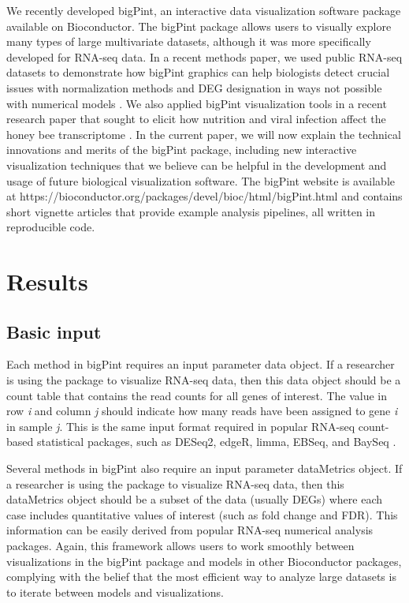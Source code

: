\documentclass[parskip=full]{bmcart}
\begin{document}
We recently developed bigPint, an interactive data visualization software package available on Bioconductor. The bigPint package allows users to visually explore many types of large multivariate datasets, although it was more specifically developed for RNA-seq data. In a recent methods paper, we used public RNA-seq datasets to demonstrate how bigPint graphics can help biologists detect crucial issues with normalization methods and DEG designation in ways not possible with numerical models \cite{rutter1}. We also applied bigPint visualization tools in a recent research paper that sought to elicit how nutrition and viral infection affect the honey bee transcriptome \cite{rutter2}. In the current paper, we will now explain the technical innovations and merits of the bigPint package, including new interactive visualization techniques that we believe can be helpful in the development and usage of future biological visualization software. The bigPint website is available at https://bioconductor.org/packages/devel/bioc/html/bigPint.html and contains short vignette articles that provide example analysis pipelines, all written in reproducible code.

\section*{Results}

\subsection*{Basic input}

Each method in bigPint requires an input parameter data object. If a researcher is using the package to visualize RNA-seq data, then this data object should be a count table that contains the read counts for all genes of interest. The value in row \textit{i} and column \textit{j} should indicate how many reads have been assigned to gene \textit{i} in sample \textit{j}. This is the same input format required in popular RNA-seq count-based statistical packages, such as DESeq2, edgeR, limma, EBSeq, and BaySeq \cite{deseq2, edger, limma, ebseq, bayseq}. 

Several methods in bigPint also require an input parameter dataMetrics object. If a researcher is using the package to visualize RNA-seq data, then this dataMetrics object should be a subset of the data (usually DEGs) where each case includes quantitative values of interest (such as fold change and FDR). This information can be easily derived from popular RNA-seq numerical analysis packages. Again, this framework allows users to work smoothly between visualizations in the bigPint package and models in other Bioconductor packages, complying with the belief that the most efficient way to analyze large datasets is to iterate between models and visualizations.
\end{document}
